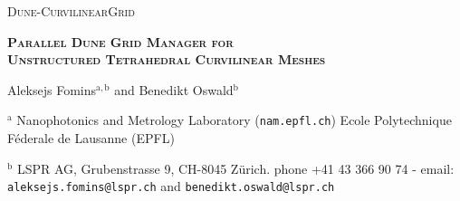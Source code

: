 \documentclass[a4paper,11pt]{article}
\begin{document}
\lstset{language=C++, breaklines=true}



\begin{titlepage}




\begin{center}
    
\noindent \textsc{{\Large Dune-CurvilinearGrid}}

\vspace{5mm}

\noindent \textbf{\textsc{{\Large Parallel Dune Grid Manager for\\Unstructured Tetrahedral Curvilinear Meshes}}}
  
\vspace{2mm}
    
{\large
    
\noindent Aleksejs Fomins$^{\mathrm{a,b}}$ and Benedikt Oswald$^{\mathrm{b}}$

  }

\vspace{1mm}

\noindent $^{\mathrm{a}}$ Nanophotonics and Metrology Laboratory (\texttt{nam.epfl.ch})
\noindent Ecole Polytechnique F\'ederale de Lausanne (EPFL)
  
\vspace{1mm}

\noindent $^{\mathrm{b}}$ LSPR AG, Grubenstrasse 9, CH-8045 Z\"urich.
\noindent phone +41 43 366 90 74 - email: \texttt{aleksejs.fomins@lspr.ch} and \texttt{benedikt.oswald@lspr.ch}

\vspace{2mm}


\end{center}











\pagebreak


\vfill


\end{titlepage}
\end{document}
